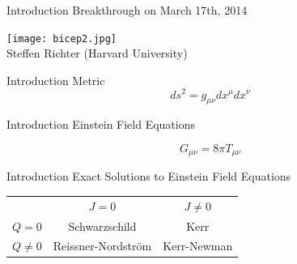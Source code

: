 \documentclass[xcolor=dvipsnames]{beamer}
\begin{document}
	\begin{frame}{Introduction}
		Breakthrough on March 17th, 2014
		\begin{center}
			\texttt{[image: bicep2.jpg]}\\
			\tiny{Steffen Richter (Harvard University)}
		\end{center}
	\end{frame}
	\begin{frame}{Introduction}
		Metric
		\huge
		\[
		ds^{2} = g_{\mu\nu}dx^{\mu}dx^{\nu}
		\]
	\end{frame}
	\begin{frame}{Introduction}
		Einstein Field Equations
		\huge
		\begin{center}
			\[
			G_{\mu\nu} = 8\pi T_{\mu\nu}
			\]
		\end{center}
	\end{frame}
	\begin{frame}{Introduction}
		Exact Solutions to Einstein Field Equations
		\begin{center}
			\Large
			\begin{tabular}{|c c c|}
				\hline
				\cellcolor[gray]{0.7}~ & \cellcolor[gray]{0.9}$J=0$ & $J \ne 0$ \\
				\rowcolor[gray]{0.9}$Q=0$ & \cellcolor[gray]{1.0}Schwarzschild & \cellcolor[gray]{0.7}Kerr \\
				\cellcolor[gray]{1.0}$Q\ne 0$ & \cellcolor[gray]{0.7}Reissner-Nordstr\"{o}m & \cellcolor[gray]{0.9}Kerr-Newman\\ \hline
			\end{tabular}
		\end{center}
	\end{frame}
\end{document}
